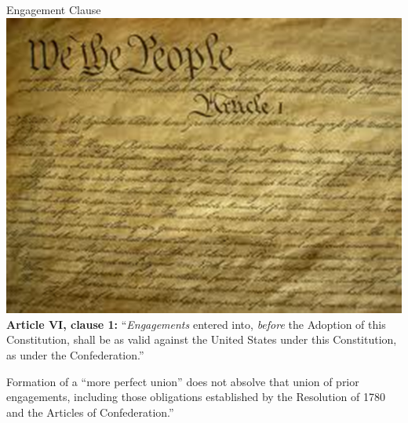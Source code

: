 \begin{frame}{Engagement Clause}
   \centering
   \includegraphics[height=.7\textheight]{img/constitution.png} \\
   \textbf{Article VI, clause 1:} ``\emph{Engagements} entered into, \emph{before} the Adoption of this Constitution, shall be as valid against the United States under this Constitution, as under the Confederation.''
\end{frame}



\begin{frame}
    \begin{block}{}
        Formation of a ``more perfect union'' does not absolve that union of prior engagements, including those obligations established by the Resolution of 1780 and the Articles of Confederation.''
    \end{block}
\end{frame}

